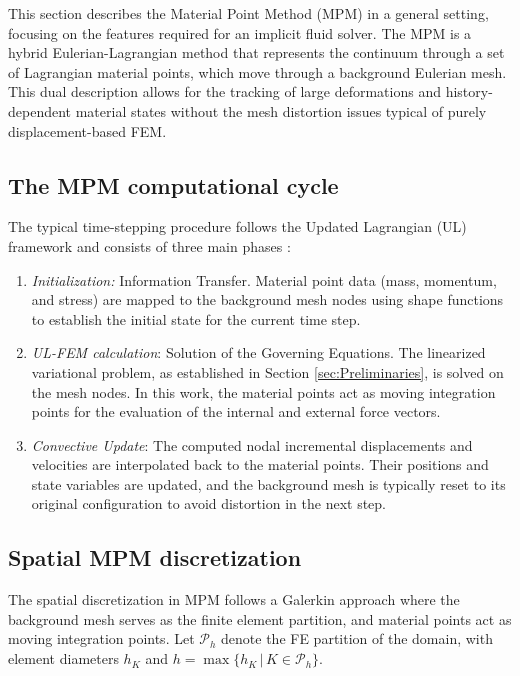 \documentclass[11pt,english]{article}
\begin{document}
This section describes the Material Point Method (MPM) in a general setting, focusing on the features required for an implicit fluid solver. The MPM is a hybrid Eulerian-Lagrangian method that represents the continuum through a set of Lagrangian material points, which move through a background Eulerian mesh. This dual description allows for the tracking of large deformations and history-dependent material states without the mesh distortion issues typical of purely displacement-based FEM.

\subsection{The MPM computational cycle} \label{sec:MPM-scheme}
The typical time-stepping procedure follows the Updated Lagrangian (UL) framework and consists of three main phases \cite{moreno2025mixed}:
\begin{enumerate}
    \item \textit{Initialization:} Information Transfer. Material point data (mass, momentum, and stress) are mapped to the background mesh nodes using shape functions to establish the initial state for the current time step.
    \item \textit{UL-FEM calculation}: Solution of the Governing Equations. The linearized variational problem, as established in Section \ref{sec:Preliminaries}, is solved on the mesh nodes. In this work, the material points act as moving integration points for the evaluation of the internal and external force vectors.
    \item \textit{Convective Update}: The computed nodal incremental displacements and velocities are interpolated back to the material points. Their positions and state variables are updated, and the background mesh is typically reset to its original configuration to avoid distortion in the next step.
\end{enumerate}

\subsection{Spatial MPM discretization} \label{sec:spatial-discretization}
    The spatial discretization in MPM follows a Galerkin approach where the background mesh serves as the finite element partition, and material points act as moving integration points. Let $\mathcal{P}_h$ denote the FE partition of the domain, with element diameters $h_K$ and $h = \max\{h_K \,|\, K\in \mathcal{P}_h\}$.
    
\end{document}

